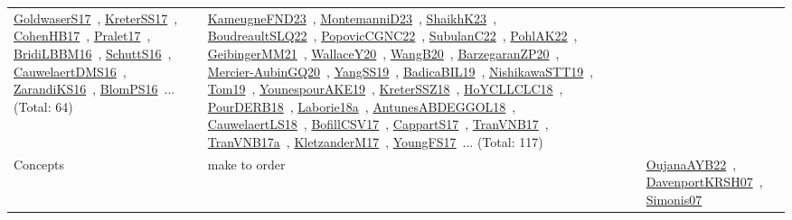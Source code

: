 {\begin{longtable}{lp{3cm}>{\raggedright\arraybackslash}p{6cm}>{\raggedright\arraybackslash}p{6cm}>{\raggedright\arraybackslash}p{8cm}}
\href{works/GoldwaserS17.pdf}{GoldwaserS17}~\cite{GoldwaserS17}, \href{works/KreterSS17.pdf}{KreterSS17}~\cite{KreterSS17}, \href{works/CohenHB17.pdf}{CohenHB17}~\cite{CohenHB17}, \href{works/Pralet17.pdf}{Pralet17}~\cite{Pralet17}, \href{works/BridiLBBM16.pdf}{BridiLBBM16}~\cite{BridiLBBM16}, \href{works/SchuttS16.pdf}{SchuttS16}~\cite{SchuttS16}, \href{works/CauwelaertDMS16.pdf}{CauwelaertDMS16}~\cite{CauwelaertDMS16}, \href{works/ZarandiKS16.pdf}{ZarandiKS16}~\cite{ZarandiKS16}, \href{works/BlomPS16.pdf}{BlomPS16}~\cite{BlomPS16}... (Total: 64) & \href{works/KameugneFND23.pdf}{KameugneFND23}~\cite{KameugneFND23}, \href{works/MontemanniD23.pdf}{MontemanniD23}~\cite{MontemanniD23}, \href{works/ShaikhK23.pdf}{ShaikhK23}~\cite{ShaikhK23}, \href{works/BoudreaultSLQ22.pdf}{BoudreaultSLQ22}~\cite{BoudreaultSLQ22}, \href{works/PopovicCGNC22.pdf}{PopovicCGNC22}~\cite{PopovicCGNC22}, \href{works/SubulanC22.pdf}{SubulanC22}~\cite{SubulanC22}, \href{works/PohlAK22.pdf}{PohlAK22}~\cite{PohlAK22}, \href{works/GeibingerMM21.pdf}{GeibingerMM21}~\cite{GeibingerMM21}, \href{works/WallaceY20.pdf}{WallaceY20}~\cite{WallaceY20}, \href{works/WangB20.pdf}{WangB20}~\cite{WangB20}, \href{works/BarzegaranZP20.pdf}{BarzegaranZP20}~\cite{BarzegaranZP20}, \href{works/Mercier-AubinGQ20.pdf}{Mercier-AubinGQ20}~\cite{Mercier-AubinGQ20}, \href{works/YangSS19.pdf}{YangSS19}~\cite{YangSS19}, \href{works/BadicaBIL19.pdf}{BadicaBIL19}~\cite{BadicaBIL19}, \href{works/NishikawaSTT19.pdf}{NishikawaSTT19}~\cite{NishikawaSTT19}, \href{works/Tom19.pdf}{Tom19}~\cite{Tom19}, \href{works/YounespourAKE19.pdf}{YounespourAKE19}~\cite{YounespourAKE19}, \href{works/KreterSSZ18.pdf}{KreterSSZ18}~\cite{KreterSSZ18}, \href{works/HoYCLLCLC18.pdf}{HoYCLLCLC18}~\cite{HoYCLLCLC18}, \href{works/PourDERB18.pdf}{PourDERB18}~\cite{PourDERB18}, \href{works/Laborie18a.pdf}{Laborie18a}~\cite{Laborie18a}, \href{works/AntunesABDEGGOL18.pdf}{AntunesABDEGGOL18}~\cite{AntunesABDEGGOL18}, \href{works/CauwelaertLS18.pdf}{CauwelaertLS18}~\cite{CauwelaertLS18}, \href{works/BofillCSV17.pdf}{BofillCSV17}~\cite{BofillCSV17}, \href{works/CappartS17.pdf}{CappartS17}~\cite{CappartS17}, \href{works/TranVNB17.pdf}{TranVNB17}~\cite{TranVNB17}, \href{works/TranVNB17a.pdf}{TranVNB17a}~\cite{TranVNB17a}, \href{works/KletzanderM17.pdf}{KletzanderM17}~\cite{KletzanderM17}, \href{works/YoungFS17.pdf}{YoungFS17}~\cite{YoungFS17}... (Total: 117)\\
Concepts & make to order &  &  & \href{works/OujanaAYB22.pdf}{OujanaAYB22}~\cite{OujanaAYB22}, \href{works/DavenportKRSH07.pdf}{DavenportKRSH07}~\cite{DavenportKRSH07}, \href{works/Simonis07.pdf}{Simonis07}~\cite{Simonis07}\\

\end{longtable}}
